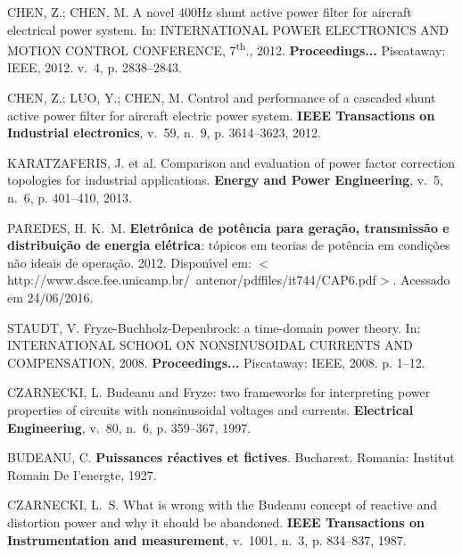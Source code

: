 \begin{thebibliography}{}
{CHEN, Z.; CHEN, M. A novel 400Hz shunt active power filter for aircraft
  electrical power system. In: \uppercase{International Power Electronics and Motion
  	Control Conference,} 7\textsuperscript{th}., 2012. \textbf{Proceedings...} Piscataway: IEEE, 2012. v.~4, p.
  2838--2843.}

{CHEN, Z.; LUO, Y.; CHEN, M. Control and performance of a cascaded shunt active
  power filter for aircraft electric power system.
\textbf{IEEE Transactions on Industrial electronics}, v.~59, n.~9, p.
  3614--3623, 2012.}

{KARATZAFERIS, J. et al. Comparison and evaluation of power factor correction
  topologies for industrial applications.
\textbf{Energy and Power Engineering}, v.~5, n.~6, p. 401--410, 2013.}

{PAREDES, H. K.~M. \textbf{Eletr\^onica de pot\^encia para gera\c{c}\~ao,
  transmiss\~ao e distribui\c{c}\~ao de energia el\'etrica}: t\'opicos em
  teorias de pot\^encia em condi\c{c}\~oes n\~ao ideais de opera\c{c}\~ao. 2012.
  Dispon{\'\i}vel em:
  $<$http://www.dsce.fee.unicamp.br/~antenor/pdffiles/it744/CAP6.pdf$>$.}
  Acessado em 24/06/2016.

{STAUDT, V. Fryze-Buchholz-Depenbrock: a time-domain power theory. In:
	\uppercase{International School on Nonsinusoidal Currents and Compensation}, 2008.
	\textbf{Proceedings...} Piscataway: IEEE, 2008. p. 1--12.}

{CZARNECKI, L. Budeanu and Fryze: two frameworks for interpreting power
  properties of circuits with nonsinusoidal voltages and currents.
\textbf{Electrical Engineering}, v.~80, n.~6, p. 359--367, 1997.}

{BUDEANU, C. \textbf{Puissances r{\'e}actives et fictives}.
	Bucharest. Romania: Institut Romain De I'energte, 1927.}

{CZARNECKI, L.~S. What is wrong with the Budeanu concept of reactive and
  distortion power and why it should be abandoned.
\textbf{IEEE Transactions on Instrumentation and measurement}, v.~1001,
  n.~3, p. 834--837, 1987.}


\end{thebibliography}
